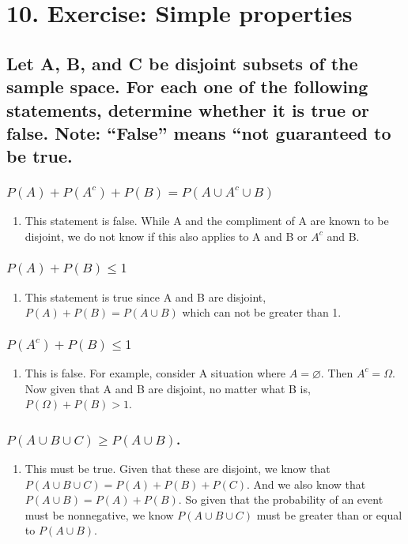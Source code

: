 \documentclass[11pt]{article}
\begin{document}
\section{10. Exercise: Simple properties}
\label{sec:org7683a7e}
\subsection{Let A, B, and C be disjoint subsets of the sample space. For each one of the following statements, determine whether it is true or false. Note: ``False'' means ``not guaranteed to be true.}
\label{sec:org38b2e84}
\subsubsection{\(P(A)+P(A^c)+P(B)=P(A\cup A^c\cup B)\)}
\label{sec:org0638beb}
\begin{enumerate}
\item This statement is false. While A and the compliment of A are known to be disjoint, we do not know if this also applies to A and B or \(A^c\) and B.
\label{sec:orgf70fe11}
\end{enumerate}
\subsubsection{\(P(A)+P(B)\le 1\)}
\label{sec:orgcdff96b}
\begin{enumerate}
\item This statement is true since A and B are disjoint, \(P(A)+P(B)=P(A\cup B)\) which can not be greater than 1.
\label{sec:org226c94f}
\end{enumerate}
\subsubsection{\(P(A^c)+P(B)\le 1\)}
\label{sec:org19a2beb}
\begin{enumerate}
\item This is false. For example, consider A situation where \(A=\varnothing\). Then \(A^c=\Omega\). Now given that A and B are disjoint, no matter what B is, \(P(\Omega)+P(B)>1\).
\label{sec:orgddd56b0}
\end{enumerate}
\subsubsection{\(P(A\cup B\cup C)\ge P(A\cup B)\).}
\label{sec:orge25889f}
\begin{enumerate}
\item This must be true. Given that these are disjoint, we know that \(P(A\cup B\cup C)=P(A)+P(B)+P(C)\). And we also know that \(P(A\cup B)= P(A)+P(B)\). So given that the probability of an event must be nonnegative, we know \(P(A\cup B\cup C)\) must be greater than or equal to \(P(A\cup B)\).
\label{sec:orgf534d65}
\end{enumerate}
\end{document}

